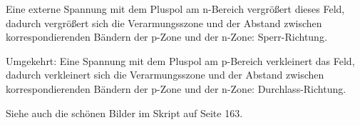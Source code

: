 Eine externe Spannung mit dem Pluspol am n-Bereich vergrößert dieses Feld, dadurch
vergrößert sich die Verarmungsszone und der Abstand zwischen korrespondierenden
Bändern der p-Zone und der n-Zone: Sperr-Richtung.

Umgekehrt: Eine Spannung mit dem Pluspol am p-Bereich verkleinert das Feld, dadurch
verkleinert sich die Verarmungsszone und der Abstand zwischen korrespondierenden
Bändern der p-Zone und der n-Zone: Durchlass-Richtung.

Siehe auch die schönen Bilder im Skript auf Seite 163.

